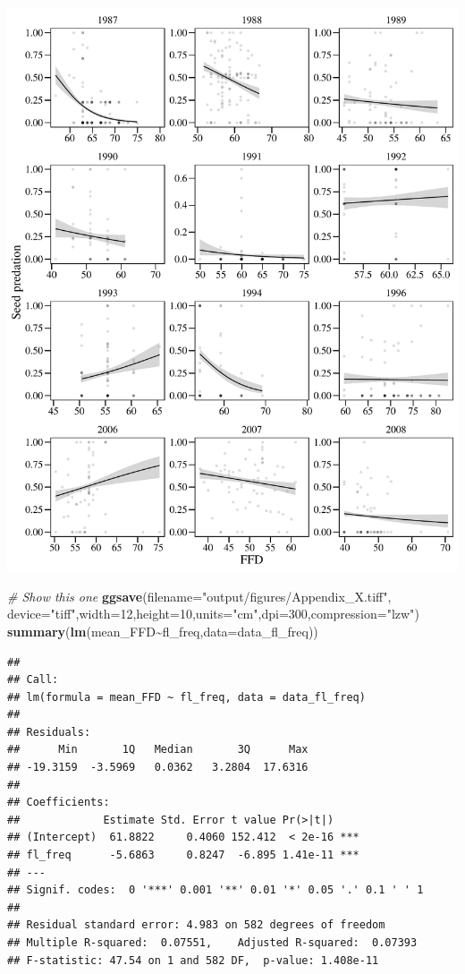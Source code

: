\documentclass[
]{article}
\newenvironment{Shaded}{\begin{snugshade}}{\end{snugshade}}
\newcommand{\CommentTok}[1]{\textcolor[rgb]{0.56,0.35,0.01}{\textit{#1}}}
\newcommand{\DataTypeTok}[1]{\textcolor[rgb]{0.13,0.29,0.53}{#1}}
\newcommand{\DecValTok}[1]{\textcolor[rgb]{0.00,0.00,0.81}{#1}}
\newcommand{\KeywordTok}[1]{\textcolor[rgb]{0.13,0.29,0.53}{\textbf{#1}}}
\newcommand{\NormalTok}[1]{#1}
\newcommand{\OperatorTok}[1]{\textcolor[rgb]{0.81,0.36,0.00}{\textbf{#1}}}
\newcommand{\StringTok}[1]{\textcolor[rgb]{0.31,0.60,0.02}{#1}}
\begin{document}
\includegraphics{lathyrus_ms3_3_after_rev_Ecology_files/figure-latex/unnamed-chunk-82-1.pdf}

\begin{Shaded}
\begin{Highlighting}[]
\CommentTok{\# Show this one}
\KeywordTok{ggsave}\NormalTok{(}\DataTypeTok{filename=}\StringTok{"output/figures/Appendix\_X.tiff"}\NormalTok{,}
       \DataTypeTok{device=}\StringTok{"tiff"}\NormalTok{,}\DataTypeTok{width=}\DecValTok{12}\NormalTok{,}\DataTypeTok{height=}\DecValTok{10}\NormalTok{,}\DataTypeTok{units=}\StringTok{"cm"}\NormalTok{,}\DataTypeTok{dpi=}\DecValTok{300}\NormalTok{,}\DataTypeTok{compression=}\StringTok{"lzw"}\NormalTok{)}
\KeywordTok{summary}\NormalTok{(}\KeywordTok{lm}\NormalTok{(mean\_FFD}\OperatorTok{\textasciitilde{}}\NormalTok{fl\_freq,}\DataTypeTok{data=}\NormalTok{data\_fl\_freq))}
\end{Highlighting}
\end{Shaded}

\begin{verbatim}
## 
## Call:
## lm(formula = mean_FFD ~ fl_freq, data = data_fl_freq)
## 
## Residuals:
##      Min       1Q   Median       3Q      Max 
## -19.3159  -3.5969   0.0362   3.2804  17.6316 
## 
## Coefficients:
##             Estimate Std. Error t value Pr(>|t|)    
## (Intercept)  61.8822     0.4060 152.412  < 2e-16 ***
## fl_freq      -5.6863     0.8247  -6.895 1.41e-11 ***
## ---
## Signif. codes:  0 '***' 0.001 '**' 0.01 '*' 0.05 '.' 0.1 ' ' 1
## 
## Residual standard error: 4.983 on 582 degrees of freedom
## Multiple R-squared:  0.07551,    Adjusted R-squared:  0.07393 
## F-statistic: 47.54 on 1 and 582 DF,  p-value: 1.408e-11
\end{verbatim}
\end{document}
